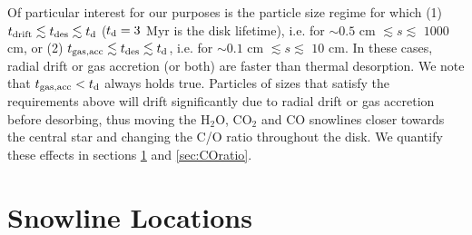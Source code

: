 \documentclass[apj]{emulateapj}
\newcommand{\emgr}[1]{\emph{ \color{gray} #1}}
\begin{document}
Of particular interest for our purposes is the particle size regime for which (1) $t_{\rm drift} \lesssim t_{\rm des} \lesssim t_{\rm d}$ ($t_{\rm d}=3$ Myr is the disk lifetime), i.e. for $\sim$$0.5$ cm $\lesssim s \lesssim$ $1000$ cm, or (2) $t_{\rm gas, acc} \lesssim t_{\rm des} \lesssim t_{\rm d}$, i.e. for $\sim$$0.1$ cm $\lesssim s \lesssim$ $10$ cm. In these cases, radial drift or gas accretion (or both) are faster than thermal desorption. We note that $t_{\rm gas, acc}<t_{\rm d}$ always holds true. Particles of sizes that satisfy the requirements above will drift significantly due to radial drift or gas accretion before desorbing, thus moving the H$_2$O, CO$_2$ and CO snowlines closer towards the central star and changing the C/O ratio throughout the disk. We quantify these effects in sections \ref{sec:snowlines} and \ref{sec:COratio}.






\section{Snowline Locations}
\label{sec:snowlines}
\end{document}
